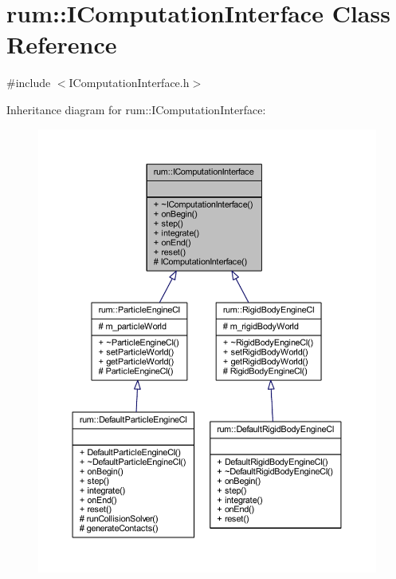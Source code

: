 \hypertarget{classrum_1_1_i_computation_interface}{}\section{rum\+:\+:I\+Computation\+Interface Class Reference}
\label{classrum_1_1_i_computation_interface}


{\ttfamily \#include $<$I\+Computation\+Interface.\+h$>$}



Inheritance diagram for rum\+:\+:I\+Computation\+Interface\+:\nopagebreak
\begin{figure}[H]
\begin{center}
\leavevmode
\includegraphics[width=350pt]{classrum_1_1_i_computation_interface__inherit__graph}
\end{center}
\end{figure}


